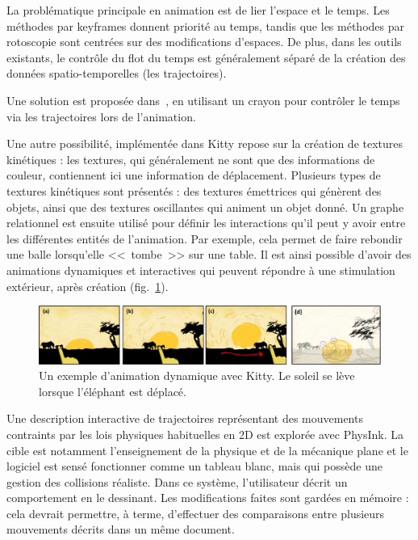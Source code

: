 \documentclass[french,12pt]{article}
\begin{document}
La problématique principale en animation est de lier l'espace et le temps. Les méthodes par keyframes donnent priorité au temps, tandis que les méthodes par rotoscopie sont centrées sur des modifications d'espaces. De plus, dans les outils existants, le contrôle du flot du temps est généralement séparé de la création des données spatio-temporelles (les trajectoires). 

Une solution est proposée dans~\cite{santosa_direct_2013}, en utilisant un crayon pour contrôler le temps via les trajectoires lors de l'animation.

Une autre possibilité, implémentée dans Kitty\cite{kazi_kitty:_2014} repose sur la création de textures kinétiques : les textures, qui généralement ne sont que des informations de couleur, contiennent ici une information de déplacement. Plusieurs types de textures kinétiques sont présentés : des textures émettrices qui génèrent des objets, ainsi que des textures oscillantes qui animent un objet donné. Un graphe relationnel est ensuite utilisé pour définir les interactions qu'il peut y avoir entre les différentes entités de l'animation. Par exemple, cela permet de faire rebondir une balle lorsqu'elle <<~tombe~>> sur une table. Il est ainsi possible d'avoir des animations dynamiques et interactives qui peuvent répondre à une stimulation extérieur, après création (fig.~\ref{fig.kitty}).

\begin{figure}[h]
    \centering
    \includegraphics[scale=0.42]{images/kitty.png}
    \caption{Un exemple d'animation dynamique avec Kitty. Le soleil se lève lorsque l'éléphant est déplacé.}
    \label{fig.kitty}
\end{figure}

Une description interactive de trajectoires représentant des mouvements contraints par les lois physiques habituelles en 2D est explorée avec PhysInk\cite{scott_physink:_2013}. 
La cible est notamment l'enseignement de la physique et de la mécanique plane et le logiciel est sensé fonctionner comme un tableau blanc, mais qui possède une gestion des collisions réaliste. 
Dans ce système, l'utilisateur décrit un comportement en le dessinant.
 Les modifications faites sont gardées en mémoire : cela devrait permettre, à terme, d'effectuer des comparaisons entre plusieurs mouvements décrits dans un même document.
 
\end{document}
